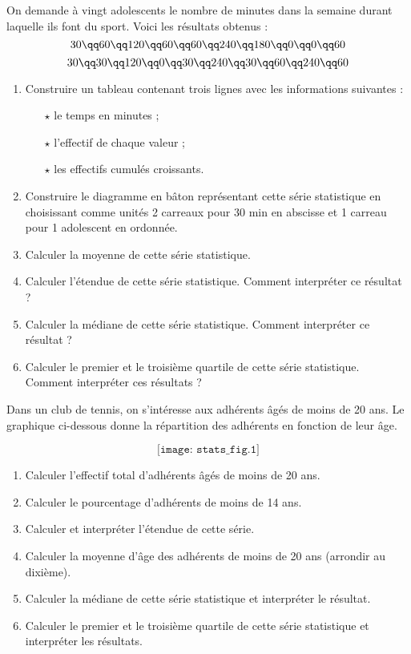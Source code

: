 \documentclass[10pt,openright,twoside,french]{book}
\begin{document}

\exo

On demande à vingt adolescents le nombre de minutes dans la semaine durant laquelle ils font du sport. Voici les résultats obtenus :
\[30 \qq 60 \qq 120 \qq 60 \qq 60 \qq 240 \qq 180 \qq 0 \qq 0 \qq 60\]\[30 \qq 30 \qq 120 \qq 0 \qq 30 \qq 240 \qq 30 \qq 60 \qq 240 \qq 60\]

\begin{enumerate}
    \item Construire un tableau contenant trois lignes avec les informations suivantes :
        \begin{itemize}
            \item[$\star$] le temps en minutes ;
            \item[$\star$] l'effectif de chaque valeur ;
            \item[$\star$] les effectifs cumulés croissants.
        \end{itemize}
    \item Construire le diagramme en bâton représentant cette série statistique en choisissant comme unités 2 carreaux pour 30 min en abscisse et 1 carreau pour 1 adolescent en ordonnée.
    \item Calculer la moyenne de cette série statistique.
    \item Calculer l'étendue de cette série statistique. Comment interpréter ce résultat ?
    \item Calculer la médiane de cette série statistique. Comment interpréter ce résultat ?
    \item Calculer le premier et le troisième quartile de cette série statistique. Comment interpréter ces résultats ?
\end{enumerate}\bigskip

\exo
Dans un club de tennis, on s'intéresse aux adhérents âgés de moins de 20 ans. Le graphique ci-dessous donne la répartition des adhérents en fonction de leur âge.\par
\[\texttt{[image: stats\_fig.1]}\]
\begin{enumerate}
    \item Calculer l'effectif total d'adhérents âgés de moins de 20 ans.
    \item Calculer le pourcentage d'adhérents de moins de 14 ans.
    \item Calculer et interpréter l'étendue de cette série.
    \item Calculer la moyenne d'âge des adhérents de moins de 20 ans (arrondir au dixième).
    \item Calculer la médiane de cette série statistique et interpréter le résultat.
    \item Calculer le premier et le troisième quartile de cette série statistique et interpréter les résultats.
\end{enumerate}
\end{document}
